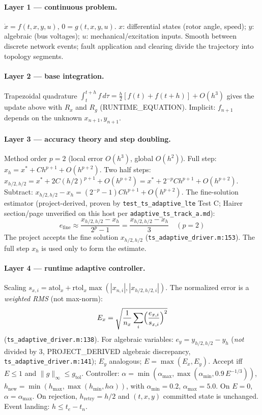 \documentclass[12pt,a4paper]{article}
\begin{document}
\paragraph{Layer 1 --- continuous problem.}
$\dot x=f(t,x,y,u)$, $0=g(t,x,y,u)$. $x$: differential states (rotor angle,
speed); $y$: algebraic (bus voltages); $u$: mechanical/excitation inputs.
Smooth between discrete network events; fault application and clearing divide
the trajectory into topology segments.

\paragraph{Layer 2 --- base integration.}
Trapezoidal quadrature $\int_t^{t+h}f\,d\tau=\frac{h}{2}[f(t)+f(t+h)]+O(h^3)$
gives the update above with $R_x$ and $R_g$ (RUNTIME\_EQUATION). Implicit:
$f_{n+1}$ depends on the unknown $x_{n+1},y_{n+1}$.

\paragraph{Layer 3 --- accuracy theory and step doubling.}
Method order $p=2$ (local error $O(h^3)$, global $O(h^2)$). Full step:
$x_h=x^\ast+Ch^{p+1}+O(h^{p+2})$. Two half steps:
$x_{h/2,h/2}=x^\ast+2C(h/2)^{p+1}+O(h^{p+2})=x^\ast+2^{-p}Ch^{p+1}+O(h^{p+2})$.
Subtract: $x_{h/2,h/2}-x_h=(2^{-p}-1)Ch^{p+1}+O(h^{p+2})$.
The fine-solution estimator (project-derived, proven by
\texttt{test\_ts\_adaptive\_lte} Test C; Hairer section/page unverified on
this host per \texttt{adaptive\_ts\_track\_a.md}):
\begin{equation}
e_{\mathrm{fine}}\approx\frac{x_{h/2,h/2}-x_h}{2^p-1}=\frac{x_{h/2,h/2}-x_h}{3}
\quad(p=2)
\end{equation}
The project accepts the fine solution $x_{h/2,h/2}$
(\texttt{ts\_adaptive\_driver.m:153}). The full step $x_h$ is used only to
form the estimate.

\paragraph{Layer 4 --- runtime adaptive controller.}
Scaling $s_{x,i}=\mathrm{atol}_x+\mathrm{rtol}_x\max(|x_{n,i}|,|x_{h/2,h/2,i}|)$.
The normalized error is a \emph{weighted RMS} (not max-norm):
\begin{equation}
E_x=\sqrt{\frac{1}{n_x}\sum_i\Bigl(\frac{e_{x,i}}{s_{x,i}}\Bigr)^2}
\end{equation}
(\texttt{ts\_adaptive\_driver.m:138}). For algebraic variables:
$e_y=y_{h/2,h/2}-y_h$ (\emph{not} divided by 3, PROJECT\_DERIVED algebraic
discrepancy, \texttt{ts\_adaptive\_driver.m:141}); $E_y$ analogous; $E=\max(E_x,E_y)$.
Accept iff $E\le 1$ and $\|g\|_\infty\le g_{\mathrm{tol}}$.
Controller: $\alpha=\min(\alpha_{\max},\max(\alpha_{\min},0.9\,E^{-1/3}))$,
$h_{\mathrm{new}}=\min(h_{\max},\max(h_{\min},h\alpha))$, with
$\alpha_{\min}=0.2$, $\alpha_{\max}=5.0$. On $E=0$, $\alpha=\alpha_{\max}$.
On rejection, $h_{\mathrm{retry}}=h/2$ and $(t,x,y)$ committed state is
unchanged. Event landing: $h\le t_e-t_n$.
\end{document}
